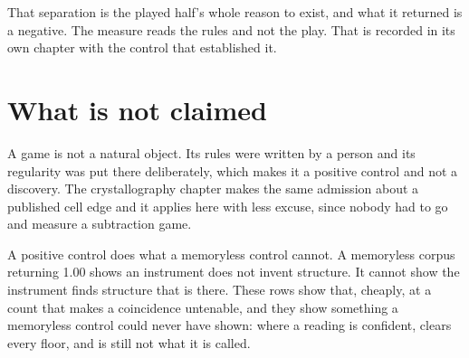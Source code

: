 That separation is the played half's whole reason to exist, and what it returned is a negative. The
measure reads the rules and not the play. That is recorded in its own chapter with the control that
established it.

\section{What is not claimed}

A game is not a natural object. Its rules were written by a person and its regularity was put there
deliberately, which makes it a positive control and not a discovery. The crystallography chapter makes
the same admission about a published cell edge and it applies here with less excuse, since nobody
had to go and measure a subtraction game.

A positive control does what a memoryless control cannot. A memoryless corpus
returning 1.00 shows an instrument does not invent structure. It cannot show the instrument finds
structure that is there. These rows show that, cheaply, at a count that makes a coincidence
untenable, and they show something a memoryless control could never have shown: where a reading is
confident, clears every floor, and is still not what it is called.
